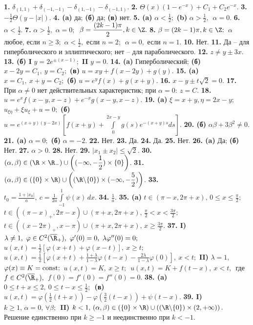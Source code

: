 \documentclass[a4paper]{article}
\def\a{\alpha}
\def\b{\beta}
\def\d{\delta}
\def\l{\lambda}
\def\fy{\varphi}
\begin{document}
{\bf 1.} $\d_{(1,1)}+\d_{(-1,-1)}-\d_{(1,-1)}-\d_{(-1,1)}.$
{\bf 2.} $\Theta(x) (1-e^{-x})+C_1+C_2e^{-x}.$
{\bf 3.} $\displaystyle{-\frac{1}{2}}\Theta(y-|x|).$
{\bf 4. (a)} да; {\bf (б)} да; {\bf (в)} нет.
{\bf 5. (a)} $\a<\displaystyle{\frac{1}{2}};$
   {\bf (b)} $\a>\displaystyle{\frac{1}{2}},$\ $\a=0.$
{\bf 6.} $\a<\displaystyle{\frac{1}{2}}$.
{\bf 7.} $\a>\displaystyle{\frac{1}{2}},$ $\a=0;$\ $\b=\displaystyle
{\frac{(2k-1)\pi}{2}}, k\in \Z.$
{\bf 8.} $\b=(2k-1)\pi, k\in \Z;$\ $\a$ любое, если $n\ge3;$
$\a<\displaystyle{\frac{1}{2}},$ если $n=2;$\ $\a=0,$ если $n=1.$
{\bf 10.} Нет.
{\bf 11.}
Да -- для гиперболического и эллиптического; нет -- для параболического.
{\bf 12.} $z\neq y\pm3x.$
{\bf 13. (б) I} $y=2 e^{\pm(x-1)};$
    {\bf II} $y=0.$
{\bf 14. (a)} Гиперболический;
    {\bf (б)} $x-2y=C_1,\ y=C_2;$
    {\bf (в)} $u=xy+f(x-2y)+g(y).$
{\bf 15. (a)} $x=C_1,\ x+y=C_2;$
    {\bf (б)} $u=e^yf(x)+g(x+y).$
{\bf 16.} $x-y\pm t\sqrt{2}=0.$
{\bf 17.} При $\a\neq0$ нет действительных характеристик; при $\a=0:\ z=C.$
{\bf 18.} $u=e^x f(x-y, x-z)+e^{-x} g(x-y,x-z).$
{\bf 19. (a)} $\xi=x+y, \eta=2x-y;$\ $u_{\xi\eta}+\xi u_\xi+u=0;$
    {\bf (б)} $u=e^{(x+y)(y-2x)}\left[f(x+y)+\displaystyle
    {\int\limits_{0}^{2x-y} g(s) e^{-(x+y)s}ds}\right].$
{\bf 20. (б)} $\a\b+3\b^2\neq0.$
{\bf 21. (a)} $\a=0;$
    {\bf (б)} $\a=-2.$
{\bf 22.} Нет.
{\bf 23.} Да.
{\bf 24.} Да.
{\bf 25.} Нет.
{\bf 26. (a)} Да;
  {\bf (б)} Нет.
{\bf 27.} $\a>0$.
{\bf 28.} Нет.
{\bf 29.} $|x_1\pm x_2|\le \sqrt{2}.$
{\bf 30.} $(\a,\b)\in (\R\times\R_-)\cup\left((-\infty, -
\displaystyle{\frac{1}{2}})\times\{0\}\right)$.
{\bf 31.} $(\a,\b)\in (\{0\}\times\R)\cup\left((\R\backslash\{0\})\times
(-\infty, -\displaystyle{\frac{5}{2}})\right)$.
{\bf 33.} $t_0=\displaystyle{\frac{1+|x_0|}{a}},\ c=\displaystyle
{\frac{1}{2a}\int\limits_{-1}^{1}\psi(x)\, dx.}$
{\bf 34.} $\displaystyle{\frac{1}{a}.}$
{\bf 35. (a)} $t\in(\pi-x,2\pi+x),\,0\le x\le\displaystyle{\frac{\pi}{2};}$
$t\in\left((\pi-x)_+,2\pi-x\right)\cup(\pi+x,2\pi+x),\,
\displaystyle{\frac{\pi}{2}}<x<\displaystyle{\frac{3\pi}{2};}$
$t\in\left((x-2\pi)_+,x-\pi\right)\cup(\pi+x,2\pi+x),\,x\ge\displaystyle
{\frac{3\pi}{2}.}$
{\bf 37. I)} $\l\neq1,\ \fy\in C^2(\overline{\R}_+),\ \fy'(0)=0,\
\l\fy''(0)=0;$\ $u(x,t)=\displaystyle{\frac{1}{2}}\left[
\fy(x+t)+\fy(x-t)\right],\ x\ge t;$\
$u(x,t)=\displaystyle{\frac{1}{2}}\left[\fy(x+t)+\frac{1+\l}{1-\l}
\fy(t-x)-\frac{2\l}{1-\l}\fy(0)\right],\ x< t;$
{\bf II)} $\l=1,\ $ $\fy(x)\equiv K=\hbox{const};$\
$u(x,t)=K,\ x\ge t;$\ $u(x,t)=K+f(t-x),\ x< t,$\
где $f\in C^2(\overline{\R}_+),$\ $f(0)=f'(0)=f''(0)=0.$
{\bf 38. (a)} $0\le t+x\le 2,\ 0\le t-x\le\displaystyle{\frac{1}{2}};$\
    {\bf (в)} $\displaystyle{u(x,t)=\fy(\frac{1}{2}(t+x))-\fy(\frac{3}{2}
    (t-x))+\psi(t-x)}.$
{\bf 39. I)} $k\ge 1,\,\a=0,\,\forall \b;$\
   {\bf II)} $k<1,\,(\a,\b)\in(\{0\}\times\R)
\cup\left((\R\backslash\{0\})\times(2,+\infty)\right).$ Решение
единственно при $k\ge -1$ и неединственно при $k<-1$.
\end{document}
